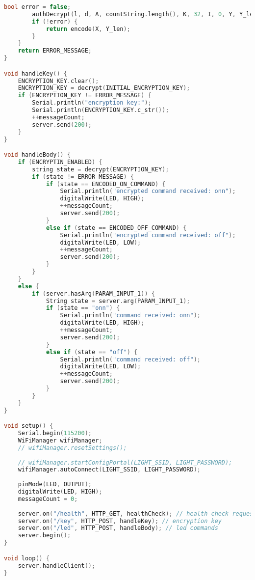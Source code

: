 \begin{lstlisting}[language=C++,label=esp-code]
		bool error = false;
		authDecrypt(l, d, A, countString.length(), K, 32, I, 0, Y, Y_len, X, T, error);
		if (!error) {
			return encode(X, Y_len);
		}
	}
	return ERROR_MESSAGE;
}

void handleKey() {
	ENCRYPTION_KEY.clear();
	ENCRYPTION_KEY = decrypt(INITIAL_ENCRYPTION_KEY);
	if (ENCRYPTION_KEY != ERROR_MESSAGE) {
		Serial.println("encryption key:");
		Serial.println(ENCRYPTION_KEY.c_str());
		++messageCount;
		server.send(200);
	}
}

void handleBody() {
	if (ENCRYPTIN_ENABLED) {
		string state = decrypt(ENCRYPTION_KEY);
		if (state != ERROR_MESSAGE) {
			if (state == ENCODED_ON_COMMAND) {
				Serial.println("encrypted command received: onn");
				digitalWrite(LED, HIGH);
				++messageCount;
				server.send(200);
			}
			else if (state == ENCODED_OFF_COMMAND) {
				Serial.println("encrypted command received: off");
				digitalWrite(LED, LOW);
				++messageCount;
				server.send(200);
			}
		}
	}
	else {
		if (server.hasArg(PARAM_INPUT_1)) {
			String state = server.arg(PARAM_INPUT_1);
			if (state == "onn") {
				Serial.println("command received: onn");
				digitalWrite(LED, HIGH);
				++messageCount;
				server.send(200);
			}
			else if (state == "off") {
				Serial.println("command received: off");
				digitalWrite(LED, LOW);
				++messageCount;
				server.send(200);
			}
		}
	}
}

void setup() {
	Serial.begin(115200);
	WiFiManager wifiManager;
	// wifiManager.resetSettings();
	
	// wifiManager.startConfigPortal(LIGHT_SSID, LIGHT_PASSWORD);
	wifiManager.autoConnect(LIGHT_SSID, LIGHT_PASSWORD);
	
	pinMode(LED, OUTPUT);
	digitalWrite(LED, HIGH);
	messageCount = 0;
	
	server.on("/health", HTTP_GET, healthCheck); // health check request
	server.on("/key", HTTP_POST, handleKey); // encryption key
	server.on("/led", HTTP_POST, handleBody); // led commands
	server.begin();
}

void loop() {
	server.handleClient();
}

\end{lstlisting}
